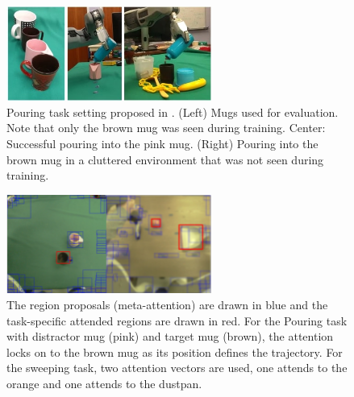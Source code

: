 \begin{figure}[t]
    \centering
    \includegraphics[width=0.6\textwidth]{figures/images/deep_object_centric_representation/pouring_task.jpg}
    \caption{Pouring task setting proposed in \cite{devin2018deep}. (Left) Mugs used for evaluation. Note that only the brown mug was seen during training. Center: Successful pouring into the pink mug. (Right) Pouring into the brown mug in a cluttered environment that was not seen during training.}
    \label{fig:pouring_task_setting}
\end{figure}

\begin{figure}[t]
    \centering
    \includegraphics[width=0.6\textwidth]{figures/images/deep_object_centric_representation/mugs_distractors.jpg}
        \caption{The region proposals (meta-attention) are drawn in blue and the task-specific attended regions are drawn in red. For the Pouring task with distractor mug (pink) and target mug (brown), the attention locks on to the brown mug as its position defines the trajectory. For the sweeping task, two attention vectors are used, one attends to the orange and one attends to the dustpan.}
    \label{fig:task_specific_attention}
\end{figure}
